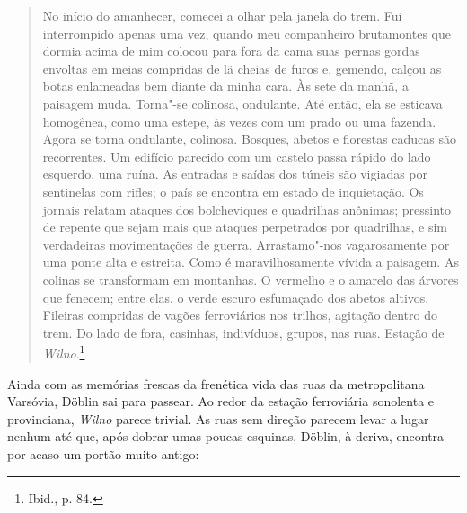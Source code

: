 \begin{quote}
No início do amanhecer, comecei a olhar pela janela do trem. Fui
interrompido apenas uma vez, quando meu companheiro brutamontes que
dormia acima de mim colocou para fora da cama suas pernas gordas
envoltas em meias compridas de lã cheias de furos e, gemendo, calçou as
botas enlameadas bem diante da minha cara. Às sete da manhã, a paisagem
muda. Torna"-se colinosa, ondulante. Até então, ela se esticava
homogênea, como uma estepe, às vezes com um prado ou uma fazenda. Agora
se torna ondulante, colinosa. Bosques, abetos e florestas caducas são
recorrentes. Um edifício parecido com um castelo passa rápido do lado
esquerdo, uma ruína. As entradas e saídas dos túneis são vigiadas por
sentinelas com rifles; o país se encontra em estado de inquietação. Os
jornais relatam ataques dos bolcheviques e quadrilhas anônimas;
pressinto de repente que sejam mais que ataques perpetrados por
quadrilhas, e sim verdadeiras movimentações de guerra. Arrastamo"-nos
vagarosamente por uma ponte alta e estreita. Como é maravilhosamente
vívida a paisagem. As colinas se transformam em montanhas. O vermelho e
o amarelo das árvores que fenecem; entre elas, o verde escuro esfumaçado
dos abetos altivos. Fileiras compridas de vagões ferroviários nos
trilhos, agitação dentro do trem. Do lado de fora, casinhas, indivíduos,
grupos, nas ruas. Estação de \textit{Wilno}.\footnote{Ibid., p. 84.}
\end{quote}

Ainda com as memórias frescas da frenética vida das ruas da
metropolitana Varsóvia, Döblin sai para passear. Ao redor da estação
ferroviária sonolenta e provinciana, \textit{Wilno} parece trivial. As ruas sem
direção parecem levar a lugar nenhum até que, após dobrar umas poucas
esquinas, Döblin, à deriva, encontra por acaso um portão muito antigo:

